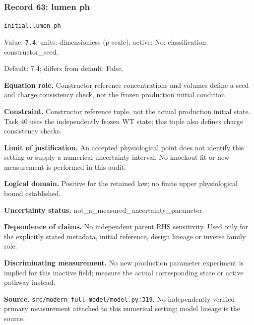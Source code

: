 \subsubsection*{Record 63: lumen ph}
{\small \nolinkurl{initial.lumen_ph}\par

Value: \texttt{7.4}; units: dimensionless (p-scale); active: No; classification: constructor\_seed.\par

Default: 7.4; differs from default: False.\par

\textbf{Equation role.} Constructor reference concentrations and volumes define a seed and charge consistency check, not the frozen production initial condition.\par

\textbf{Constraint.} Constructor reference tuple, not the actual production initial state. Task 40 uses the independently frozen WT state; this tuple also defines charge consistency checks.\par

\textbf{Limit of justification.} An accepted physiological point does not identify this setting or supply a numerical uncertainty interval. No knockout fit or new measurement is performed in this audit.\par

\textbf{Logical domain.} Positive for the retained law; no finite upper physiological bound established.\par

\textbf{Uncertainty status.} not\_a\_measured\_uncertainty\_parameter\par

\textbf{Dependence of claims.} No independent parent RHS sensitivity. Used only for the explicitly stated metadata, initial reference, design lineage or inverse family role.\par

\textbf{Discriminating measurement.} No new production parameter experiment is implied for this inactive field; measure the actual corresponding state or active pathway instead.\par

\textbf{Source.} \nolinkurl{src/modern_full_model/model.py:319}. No independently verified primary measurement attached to this numerical setting; model lineage is the source.\par}

